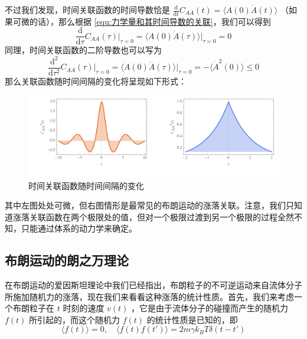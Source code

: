 不过我们发现，时间关联函数的时间导数恰是 $\displaystyle \frac{\mathrm{d}}{\mathrm{d}t}C_{AA}(t) = \langle  A(0)\dot{A}(t) \rangle$ （如果可微的话），那么根据 \eqref{equ:力学量和其时间导数的关联}，我们可以得到
\begin{equation}\label{equ:时间关联函数的时间导数}
    \frac{\mathrm{d}}{\mathrm{d}\tau}C_{AA}(\tau)\bigg|_{\tau = 0}  = \langle  A(0)\dot{A}(\tau) \rangle \bigg|_{\tau = 0} = 0
\end{equation}
同理，时间关联函数的二阶导数也可以写为
\begin{equation}\label{equ:时间关联函数的二阶时间导数}
    \frac{\mathrm{d}^2}{\mathrm{d}\tau^2}C_{AA}(\tau)\bigg|_{\tau = 0}  = \langle  A(0)\ddot{A}(\tau) \rangle \bigg|_{\tau = 0} = - \langle  \dot{A}^2(0) \rangle \leqslant 0
\end{equation}
那么关联函数随时间间隔的变化将呈现如下形式：

\begin{figure}[ht]
    \centering
    \includegraphics[width=1\textwidth]{figures/time-corr.png}
    \caption{时间关联函数随时间间隔的变化}
    \label{fig:time-corr}
\end{figure}

其中左图处处可微，但右图情形是最常见的布朗运动的涨落关联。注意，我们只知道涨落关联函数在两个极限处的值，但对一个极限过渡到另一个极限的过程全然不知，只能通过体系的动力学来确定。

\subsection{布朗运动的朗之万理论}\label{subsec:布朗运动的朗之万理论}

在布朗运动的爱因斯坦理论中我们已经指出，布朗粒子的不可逆运动来自流体分子所施加随机力的涨落，现在我们来看看这种涨落的统计性质。首先，我们来考虑一个布朗粒子在 $t$ 时刻的速度 $v(t)$ ，它是由于流体分子的碰撞而产生的随机力 $f(t)$ 所引起的，而这个随机力 $f(t)$ 的统计性质是已知的，即
\begin{equation}\label{equ:随机力的统计性质}
    \langle f(t) \rangle = 0, \quad \langle f(t)f(t') \rangle = 2m\gamma k_BT\delta(t-t')
\end{equation}


